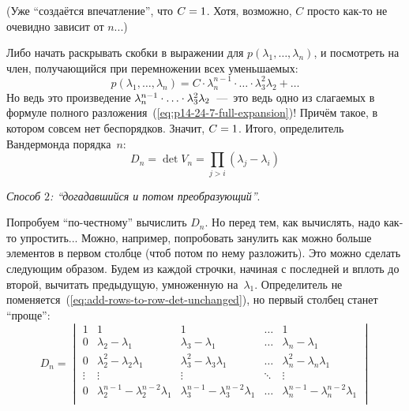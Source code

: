 \documentclass[a4paper,12pt]{article}
\theoremstyle{remark}
\begin{document}
\begin{solution}
    (Уже ``создаётся впечатление'', что $C \hm= 1$.
    Хотя, возможно, $C$ просто как-то не очевидно зависит от $n$...)
    
    Либо начать раскрывать скобки в выражении для $p(\lambda_1, \ldots, \lambda_n)$, и посмотреть на член, получающийся при перемножении всех уменьшаемых:
    \[
      p(\lambda_1, \ldots, \lambda_n) = C \cdot \lambda_n^{n-1} \cdot \ldots \cdot \lambda_3^2 \lambda_2 + \ldots
    \]
    Но ведь это произведение $\lambda_n^{n-1} \hm\cdot \ldots \hm\cdot \lambda_3^2 \lambda_2$~---~это ведь одно из слагаемых в формуле полного разложения~(\ref{eq:p14-24-7-full-expansion})!
    Причём такое, в котором совсем нет беспорядков.
    Значит, $C \hm= 1$.
    Итого, определитель Вандермонда порядка~$n$:
    \begin{equation}\label{eq:vander-de-mond}
      D_n = \det V_n = \prod_{j > i} (\lambda_j - \lambda_i)
    \end{equation}
    
    \medskip
    
    \emph{Способ $2$: ``догадавшийся и потом преобразующий''}.
    
    Попробуем ``по-честному'' вычислить $D_n$.
    Но перед тем, как вычислять, надо как-то упростить...
    Можно, например, попробовать занулить как можно больше элементов в первом столбце (чтоб потом по нему разложить).
    Это можно сделать следующим образом.
    Будем из каждой строчки, начиная с последней и вплоть до второй, вычитать предыдущую, умноженную на~$\lambda_1$.
    Определитель не поменяется~(\ref{eq:add-rows-to-row-det-unchanged}), но первый столбец станет ``проще'':
    \[
      D_n
      = \begin{vmatrix}
        1      & 1                                           & 1                                           & \ldots & 1\\
        0      & \lambda_2 - \lambda_1                       & \lambda_3 - \lambda_1                       & \ldots & \lambda_n - \lambda_1\\
        0      & \lambda_2^2 - \lambda_2 \lambda_1           & \lambda_3^2 - \lambda_3 \lambda_1           & \ldots & \lambda_n^2 - \lambda_n \lambda_1\\
        \vdots & \vdots                                      & \vdots                                      & \ddots & \vdots\\
        0      & \lambda_2^{n-1} - \lambda_2^{n-2} \lambda_1 & \lambda_3^{n-1} - \lambda_3^{n-2} \lambda_1 & \ldots & \lambda_n^{n-1} - \lambda_n^{n-2} \lambda_1\\
      \end{vmatrix}
    \]
    

\end{solution}
\end{document}
